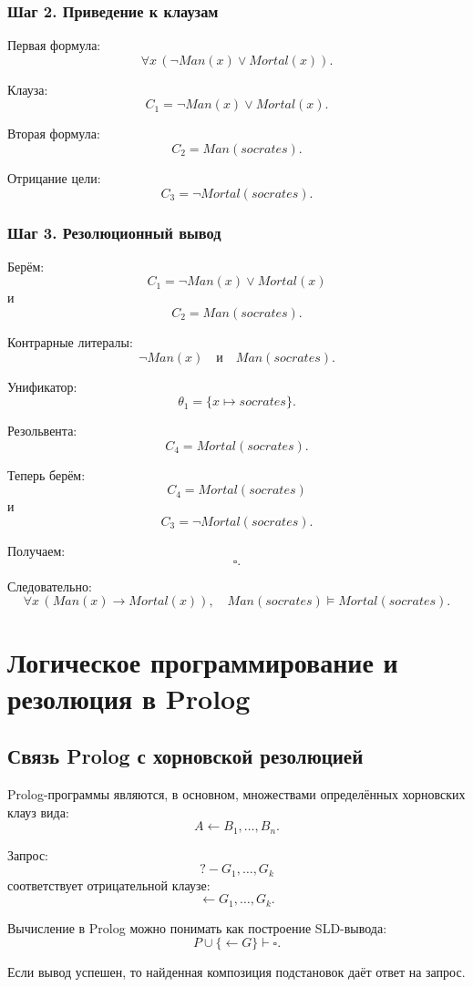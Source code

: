\documentclass[12pt,a4paper]{article}
\begin{document}
\subsubsection{Шаг 2. Приведение к клаузам}

Первая формула:
\[
\forall x\,(\neg Man(x) \lor Mortal(x)).
\]

Клауза:
\[
C_1 = \neg Man(x) \lor Mortal(x).
\]

Вторая формула:
\[
C_2 = Man(socrates).
\]

Отрицание цели:
\[
C_3 = \neg Mortal(socrates).
\]

\subsubsection{Шаг 3. Резолюционный вывод}

Берём:
\[
C_1 = \neg Man(x) \lor Mortal(x)
\]
и
\[
C_2 = Man(socrates).
\]

Контрарные литералы:
\[
\neg Man(x)
\quad\text{и}\quad
Man(socrates).
\]

Унификатор:
\[
\theta_1 = \{x \mapsto socrates\}.
\]

Резольвента:
\[
C_4 = Mortal(socrates).
\]

Теперь берём:
\[
C_4 = Mortal(socrates)
\]
и
\[
C_3 = \neg Mortal(socrates).
\]

Получаем:
\[
\square.
\]

Следовательно:
\[
\forall x\,(Man(x) \to Mortal(x)), \quad Man(socrates)
\models Mortal(socrates).
\]

\section{Логическое программирование и резолюция в Prolog}

\subsection{Связь Prolog с хорновской резолюцией}

Prolog-программы являются, в основном, множествами определённых хорновских клауз вида:
\[
A \leftarrow B_1,\dots,B_n.
\]

Запрос:
\[
?- G_1,\dots,G_k
\]
соответствует отрицательной клаузе:
\[
\leftarrow G_1,\dots,G_k.
\]

Вычисление в Prolog можно понимать как построение SLD-вывода:
\[
P \cup \{\leftarrow G\} \vdash \square.
\]

Если вывод успешен, то найденная композиция подстановок даёт ответ на запрос.
\end{document}
